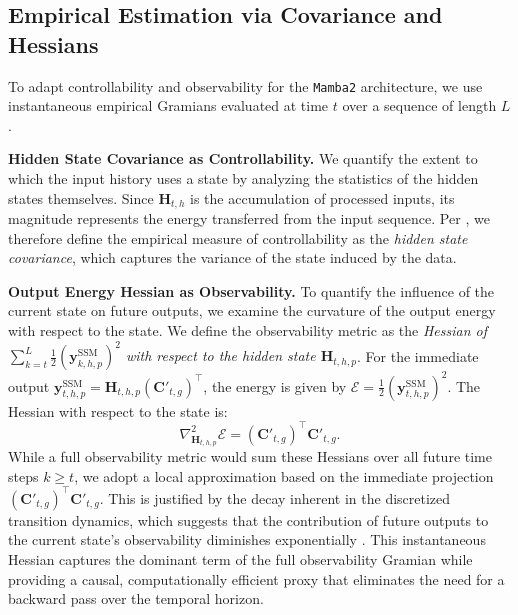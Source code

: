 \documentclass{article}
\theoremstyle{plain}
\theoremstyle{definition}
\theoremstyle{remark}
\begin{document}
\subsection{Empirical Estimation via Covariance and Hessians}
\label{subsec:gramians}
To adapt controllability and observability for the \texttt{Mamba2} architecture, we use instantaneous empirical Gramians \citep{lall2002subspace, a11070091} evaluated at time $t$ over a sequence of length $L$.

\textbf{Hidden State Covariance as Controllability.} We quantify the extent to which the input history uses a state by analyzing the statistics of the hidden states themselves. Since $\bm{H}_{t,h}$ is the accumulation of processed inputs, its magnitude represents the energy transferred from the input sequence. Per \citet{a11070091}, we therefore define the empirical measure of controllability as the \textit{hidden state covariance}, which captures the variance of the state induced by the data.

\textbf{Output Energy Hessian as Observability.} To quantify the influence of the current state on future outputs, we examine the curvature of the output energy with respect to the state. We define the observability metric as the \textit{Hessian of $\sum_{k = t}^{L} \frac{1}{2} ( \bm{y}^{\text{SSM}}_{k,h,p} )^2$ with respect to the hidden state $\bm{H}_{t,h,p}$}. For the immediate output $\bm{y}^{\text{SSM}}_{t,h,p} = \bm{H}_{t,h,p} (\bm{C}'_{t,g})^\top$, the energy is given by $\mathcal{E} = \frac{1}{2} ( \bm{y}^{\text{SSM}}_{t,h,p} )^2$. The Hessian with respect to the state is:
\begin{equation*}
\nabla^2_{\bm{H}_{t,h,p}} \mathcal{E} = (\bm{C}'_{t,g})^\top \bm{C}'_{t,g}.
\end{equation*}
While a full observability metric would sum these Hessians over all future time steps $k \geq t$, we adopt a local approximation based on the immediate projection $(\bm{C}'_{t,g})^\top \bm{C}'_{t,g}$. This is justified by the decay inherent in the discretized transition dynamics, which suggests that the contribution of future outputs to the current state's observability diminishes exponentially \citep{gwak2025layeradaptivestatepruningdeep}. This instantaneous Hessian captures the dominant term of the full observability Gramian while providing a causal, computationally efficient proxy that eliminates the need for a backward pass over the temporal horizon.
\end{document}
